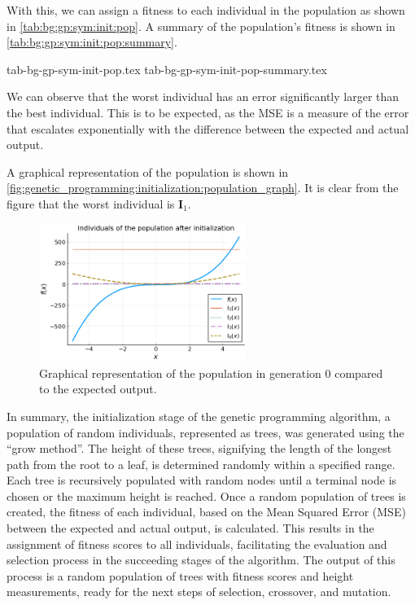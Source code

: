  With this, we can assign a fitness to each individual in the population as
  shown in \vref{tab:bg:gp:sym:init:pop}.
  A summary of the population's fitness is shown in
  \vref{tab:bg:gp:sym:init:pop:summary}.

  {tab-bg-gp-sym-init-pop.tex}
  {tab-bg-gp-sym-init-pop-summary.tex}

  We can observe that the worst individual has an error significantly larger
  than the best individual.
  This is to be expected, as the MSE is a measure of the error that escalates
  exponentially with the difference between the expected and actual output.  

  A graphical representation of the population is shown in
  \vref{fig:genetic_programming:initialization:population_graph}.
  It is clear from the figure that the worst individual is \(\mathbf{I}_1\).

  \begin{figure}[ht!]
    \centering
    \includegraphics[width=0.6\textwidth]
      {img/theoretical_framework/gp_pop_init.png}
    \caption{
      Graphical representation of the population in generation 0 compared to the
      expected output.
    }
    \label{fig:genetic_programming:initialization:population_graph}
  \end{figure}

  
  In summary, the initialization stage of the genetic programming algorithm, a 
  population of random individuals, represented as trees, was generated using 
  the \enquote{grow method}.
  The height of these trees, signifying the length of the longest path from the
  root to a leaf, is determined randomly within a specified range.
  Each tree is recursively populated with random nodes until a terminal node is
  chosen or the maximum height is reached.
  Once a random population of trees is created, the fitness of each individual,
  based on the Mean Squared Error (MSE) between the expected and actual output,
  is calculated.
  This results in the assignment of fitness scores to all individuals,
  facilitating the evaluation and selection process in the succeeding stages of
  the algorithm.
  The output of this process is a random population of trees with fitness scores
  and height measurements, ready for the next steps of selection, crossover, and
  mutation.
